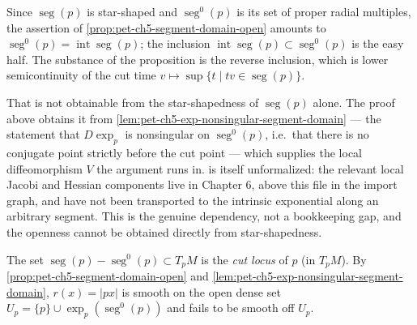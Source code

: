 \begin{remark}
  \label{rem:pet-ch5-segment-domain-open-blocker}
  Since $\operatorname{seg}(p)$ is star-shaped and $\operatorname{seg}^0(p)$ is its
  set of proper radial multiples, the assertion of
  \cref{prop:pet-ch5-segment-domain-open} amounts to
  $\operatorname{seg}^0(p)=\operatorname{int}\operatorname{seg}(p)$; the inclusion
  $\operatorname{int}\operatorname{seg}(p)\subset\operatorname{seg}^0(p)$ is the
  easy half. The substance of the proposition is the reverse inclusion, which is
  lower semicontinuity of the cut time $v\mapsto\sup\{t\mid tv\in
  \operatorname{seg}(p)\}$.

  That is not obtainable from the star-shapedness of $\operatorname{seg}(p)$ alone.
  The proof above obtains it from
  \cref{lem:pet-ch5-exp-nonsingular-segment-domain} — the statement that $D\exp_p$
  is nonsingular on $\operatorname{seg}^0(p)$, i.e.\ that there is no conjugate
  point strictly before the cut point — which supplies the local diffeomorphism $V$
  the argument runs in.  is itself
  unformalized: the relevant local Jacobi and Hessian components live in Chapter 6,
  above this file in the import graph, and have not been transported to the intrinsic
  exponential along an arbitrary segment. This is the genuine dependency, not a
  bookkeeping gap, and the openness cannot be obtained directly from star-shapedness.
\end{remark}

\begin{definition}
  \label{def:pet-ch5-cut-locus}
  \leanok
  The set $\operatorname{seg}(p)-\operatorname{seg}^0(p)\subset T_pM$ is the
  \emph{cut locus} of $p$ (in $T_pM$). By
  \cref{prop:pet-ch5-segment-domain-open} and
  \cref{lem:pet-ch5-exp-nonsingular-segment-domain},
  $r(x)=|px|$ is smooth on the open dense set $U_p=\{p\}\cup\exp_p(\operatorname{seg}^0(p))$
  and fails to be smooth off $U_p$.
\end{definition}

